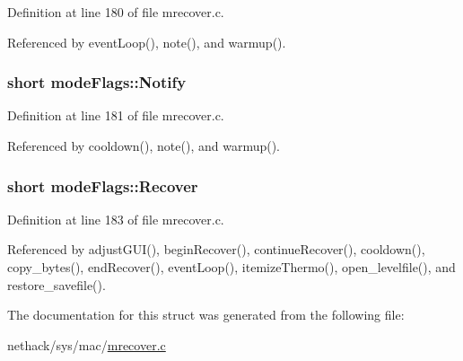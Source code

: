 Definition at line 180 of file mrecover.\+c.



Referenced by event\+Loop(), note(), and warmup().

\hypertarget{structmodeFlags_a31b8bfcea3aac0deaf5d6bcb7d07c622}{
\subsubsection[{Notify}]{\setlength{\rightskip}{0pt plus 5cm}short mode\+Flags\+::\+Notify}}\label{structmodeFlags_a31b8bfcea3aac0deaf5d6bcb7d07c622}


Definition at line 181 of file mrecover.\+c.



Referenced by cooldown(), note(), and warmup().

\hypertarget{structmodeFlags_a098cf3c5051decf3beaf18608ff5881a}{
\subsubsection[{Recover}]{\setlength{\rightskip}{0pt plus 5cm}short mode\+Flags\+::\+Recover}}\label{structmodeFlags_a098cf3c5051decf3beaf18608ff5881a}


Definition at line 183 of file mrecover.\+c.



Referenced by adjust\+G\+U\+I(), begin\+Recover(), continue\+Recover(), cooldown(), copy\+\_\+bytes(), end\+Recover(), event\+Loop(), itemize\+Thermo(), open\+\_\+levelfile(), and restore\+\_\+savefile().



The documentation for this struct was generated from the following file\+:\begin{DoxyCompactItemize}
\item 
nethack/sys/mac/\hyperlink{mrecover_8c}{mrecover.\+c}\end{DoxyCompactItemize}
